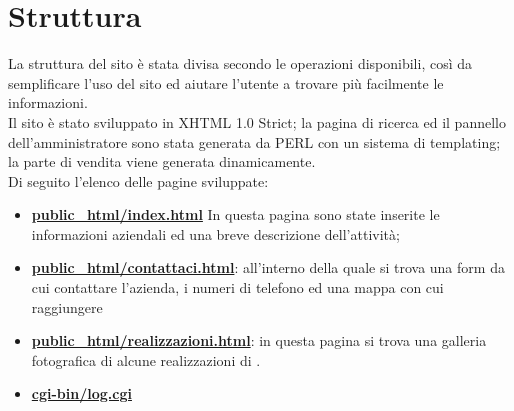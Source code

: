 \section{Struttura}{
	La struttura del sito è stata divisa secondo le operazioni disponibili, così da semplificare l'uso del sito ed aiutare l'utente a trovare più facilmente le informazioni.
	\\
	Il sito è stato sviluppato in XHTML 1.0 Strict; la pagina di ricerca ed il pannello dell'amministratore sono stata generata da PERL con un sistema di templating; la parte di vendita viene generata dinamicamente.
	\\
	Di seguito l'elenco delle pagine sviluppate:
	\begin{itemize}
		\item \textbf{\url{ public_html/index.html}} In questa pagina sono state inserite le informazioni aziendali ed una breve descrizione dell'attività; 
		\item \textbf{\url{public_html/contattaci.html}}: all'interno della quale si trova una form da cui contattare l'azienda, i numeri di telefono ed una mappa con cui raggiungere \textbf{\ggt} 
		\item \textbf{\url{public_html/realizzazioni.html}}: in questa pagina si trova una galleria fotografica di alcune realizzazioni di \textbf{\ggt}.
		\item \textbf{\url{cgi-bin/log.cgi}} 
	\end{itemize}
}
